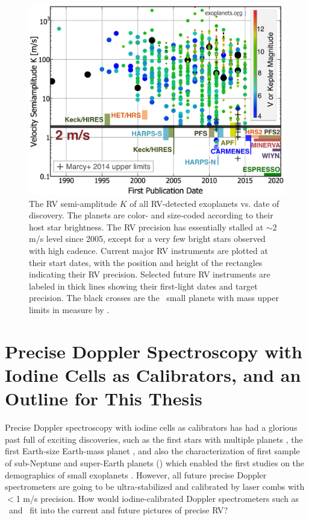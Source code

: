 \begin{figure}
\centering
\includegraphics[scale=0.32]{introduction/family-big-carmenes.eps}
\caption{The RV semi-amplitude $K$ of all RV-detected exoplanets
  vs. date of discovery. The planets are color- and size-coded according
  to their host star brightness. The RV precision has essentially
  stalled at $\sim$2 m/s level since 2005, except for a very few bright
  stars observed with high cadence. Current major RV instruments are
  plotted at their start dates, with the position and height of the
  rectangles indicating their RV precision. Selected future RV
  instruments are labeled in thick lines showing their first-light dates
  and target precision. The black crosses are the \kepler\ small planets
  with mass upper limits in \cite{marcy2014} measure by \keck.
\label{intro:fig:family}}
\end{figure}



\section{Precise Doppler Spectroscopy with Iodine Cells as
  Calibrators, and an Outline for This Thesis} 

Precise Doppler spectroscopy with iodine cells as calibrators has had
a glorious past full of exciting discoveries, such as the first stars
with multiple planets \citep{butler1999}, the first Earth-size
Earth-mass planet \cite{howard2013, pepe2013}, and also the
characterization of first sample of sub-Neptune and super-Earth
planets (\citealt{marcy2014}) which enabled the first studies on the
demographics of small exoplanets
\citep{wu2013, weiss2014, rogers2015, wolfgang2015a, wolfgang2015b}. However,
all future precise Doppler spectrometers are going to be
ultra-stabilized and calibrated by laser combs with $<$1 m/s
precision. How would iodine-calibrated Doppler spectrometers such as
\het\ and \keck\ fit into the current and future pictures of precise
RV?

